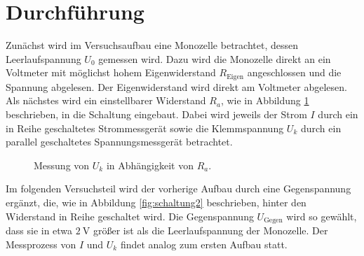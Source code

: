 \section{Durchführung}
\label{sec:Durchführung}

Zunächst wird im Versuchsaufbau eine Monozelle betrachtet, dessen Leerlaufspannung $U_0$ gemessen wird.
Dazu wird die Monozelle direkt an ein Voltmeter mit möglichst hohem Eigenwiderstand $R_{\text{Eigen}}$ angeschlossen und die Spannung abgelesen.
Der Eigenwiderstand wird direkt am Voltmeter abgelesen. \\
Als nächstes wird ein einstellbarer Widerstand $R_a$, wie in Abbildung \ref{fig:schaltung1} beschrieben, in die Schaltung eingebaut.%
Dabei wird jeweils der Strom $I$ durch ein in Reihe geschaltetes Strommessgerät sowie die Klemmspannung $U_k$ durch ein parallel geschaltetes Spannungsmessgerät betrachtet.

\begin{figure}[H]
  \centering
    \caption{Messung von $U_k$ in Abhängigkeit von $R_a$.}
    \label{fig:schaltung1}
\end{figure}

Im folgenden Versuchsteil wird der vorherige Aufbau durch eine Gegenspannung ergänzt, die, wie in Abbildung \ref{fig:schaltung2} beschrieben, hinter den Widerstand in Reihe geschaltet wird.
Die Gegenspannung $U_{\text{Gegen}}$ wird so gewählt, dass sie in etwa $\SI{2}{\volt}$ größer ist als die Leerlaufspannung der Monozelle.
Der Messprozess von $I$ und $U_k$ findet analog zum ersten Aufbau statt.


\tikzset{circuit declare symbol = DC source}

